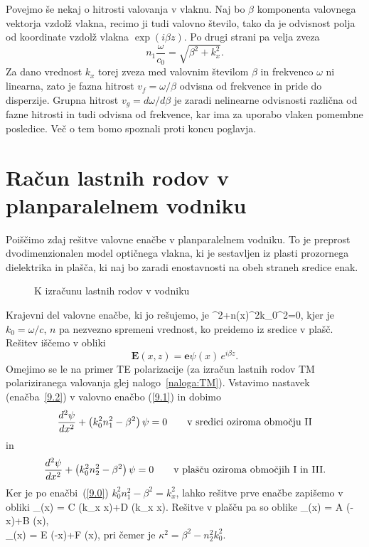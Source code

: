 Povejmo še nekaj o hitrosti valovanja v vlaknu.
Naj bo $\beta$ komponenta valovnega vektorja vzdolž
vlakna, recimo ji tudi valovno število, tako da je odvisnost polja
od koordinate vzdolž vlakna $\exp (i\beta z)$. Po drugi strani pa velja
zveza
\begin{equation}
n_{1}\frac{\omega}{c_0}=\sqrt{\beta^{2}+k_{x}^{2}}
\label{9.0}.
\end{equation}
Za dano vrednost $k_{x}$ torej zveza med valovnim številom $\beta$
in frekvenco $\omega$ ni linearna, zato je fazna hitrost $v_{f}=\omega/\beta$
odvisna od frekvence in pride do disperzije. Grupna hitrost $v_{g}=d\omega/d\beta$ 
je zaradi nelinearne odvisnosti različna od fazne hitrosti in tudi odvisna od 
frekvence, kar ima za uporabo vlaken pomembne posledice. Več o tem bomo spoznali 
proti koncu poglavja. 

\section{Račun lastnih rodov v planparalelnem vodniku}
Poiščimo zdaj rešitve valovne enačbe v planparalelnem vodniku. 
To je preprost dvodimenzionalen model optičnega vlakna, ki je sestavljen iz 
plasti prozornega dielektrika in plašča, ki naj bo zaradi enostavnosti na obeh 
straneh sredice enak. 
\begin{figure}[h]
\centering
\def\svgwidth{120truemm} 

\caption{K izračunu lastnih rodov v vodniku}
\label{fig:vodnikracun}
\end{figure}

Krajevni del valovne enačbe, ki jo rešujemo,
je
\beq
\nabla^{2}+n\left(x\right)^{2}k_{0}^{2}=0,
\label{9.1}
\eeq
kjer je $k_{0}=\omega/c$, $n$ pa nezvezno spremeni vrednost, ko preidemo iz sredice v plašč. 
Rešitev iščemo v obliki 
\begin{equation}
{\mathbf E}(x,z)=\mathbf{e}\psi\left(x\right)\, e^{i\beta z}.
\label{9.2}
\end{equation}
Omejimo se le na primer TE polarizacije (za izračun lastnih rodov TM polariziranega
valovanja glej nalogo~\ref{naloga:TM}). Vstavimo nastavek (enačba~\ref{9.2}) v valovno enačbo
(\ref{9.1}) in dobimo
\begin{equation}
\frac{d^{2}{\bf \psi}}{dx^{2}}+\left(k_{0}^{2}n_1^{2}-\beta^{2}\right){\bf \psi}=0
\qquad \textrm{v sredici oziroma obmo\v cju II} 
\label{9.3}
\end{equation}
in 
\begin{equation}
\frac{d^{2}{\bf \psi}}{dx^{2}}+\left(k_{0}^{2}n_2^{2}-\beta^{2}\right){\bf \psi}=0
\qquad \textrm{v plašču oziroma obmo\v cjih I in III.} 
\label{9.3}
\end{equation}
Ker je po enačbi~(\ref{9.0}) $k_0^2n_1^2-\beta^2=k_x^2$, lahko rešitve prve enačbe
zapišemo v obliki
\beq
\psi_{}(x) = C \cos(k_x x)+D \sin(k_x x).
\eeq
Rešitve v plašču pa so oblike
\beq
\psi_{}(x) = A \exp(-\kappa x)+B \exp(\kappa x),\\
\psi_{}(x) = E \exp(-\kappa x)+F \exp(\kappa x),
\eeq
pri čemer je $\kappa^2= \beta^2-n_2^2k_0^2$.

